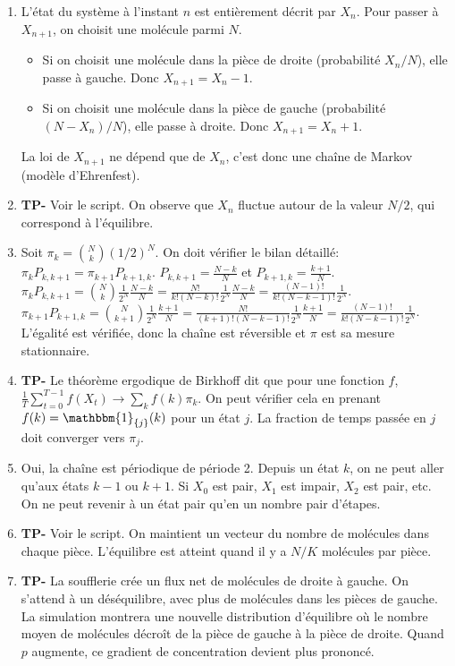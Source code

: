 \documentclass[solutions]{exercices}
\begin{document}
\begin{solution}
	\begin{enumerate}
		\item L'état du système à l'instant $n$ est entièrement décrit par $X_n$. Pour passer à $X_{n+1}$, on choisit une molécule parmi $N$.
		      \begin{itemize}
			      \item Si on choisit une molécule dans la pièce de droite (probabilité $X_n/N$), elle passe à gauche. Donc $X_{n+1} = X_n - 1$.
			      \item Si on choisit une molécule dans la pièce de gauche (probabilité $(N-X_n)/N$), elle passe à droite. Donc $X_{n+1} = X_n + 1$.
		      \end{itemize}
		      La loi de $X_{n+1}$ ne dépend que de $X_n$, c'est donc une chaîne de Markov (modèle d'Ehrenfest).
		\item \textbf{TP-} Voir le script. On observe que $X_n$ fluctue autour de la valeur $N/2$, qui correspond à l'équilibre.
		\item Soit $\pi_k = \binom{N}{k} (1/2)^N$. On doit vérifier le bilan détaillé: $\pi_k P_{k, k+1} = \pi_{k+1} P_{k+1, k}$.
		      $P_{k, k+1} = \frac{N-k}{N}$ et $P_{k+1, k} = \frac{k+1}{N}$.
		      $\pi_k P_{k, k+1} = \binom{N}{k} \frac{1}{2^N} \frac{N-k}{N} = \frac{N!}{k!(N-k)!} \frac{1}{2^N} \frac{N-k}{N} = \frac{(N-1)!}{k!(N-k-1)!} \frac{1}{2^N}$.
		      $\pi_{k+1} P_{k+1, k} = \binom{N}{k+1} \frac{1}{2^N} \frac{k+1}{N} = \frac{N!}{(k+1)!(N-k-1)!} \frac{1}{2^N} \frac{k+1}{N} = \frac{(N-1)!}{k!(N-k-1)!} \frac{1}{2^N}$.
		      L'égalité est vérifiée, donc la chaîne est réversible et $\pi$ est sa mesure stationnaire.
		\item \textbf{TP-} Le théorème ergodique de Birkhoff dit que pour une fonction $f$, $\frac{1}{T}\sum_{t=0}^{T-1} f(X_t) \to \sum_k f(k)\pi_k$. On peut vérifier cela en prenant $f(k) = \mathbbm{1}_{\{j\}}(k)$ pour un état $j$. La fraction de temps passée en $j$ doit converger vers $\pi_j$.
		\item Oui, la chaîne est périodique de période 2. Depuis un état $k$, on ne peut aller qu'aux états $k-1$ ou $k+1$. Si $X_0$ est pair, $X_1$ est impair, $X_2$ est pair, etc. On ne peut revenir à un état pair qu'en un nombre pair d'étapes.
		\item \textbf{TP-} Voir le script. On maintient un vecteur du nombre de molécules dans chaque pièce. L'équilibre est atteint quand il y a $N/K$ molécules par pièce.
		\item \textbf{TP-} La soufflerie crée un flux net de molécules de droite à gauche. On s'attend à un déséquilibre, avec plus de molécules dans les pièces de gauche. La simulation montrera une nouvelle distribution d'équilibre où le nombre moyen de molécules décroît de la pièce de gauche à la pièce de droite. Quand $p$ augmente, ce gradient de concentration devient plus prononcé.
	\end{enumerate}
\end{solution}
\end{document}
